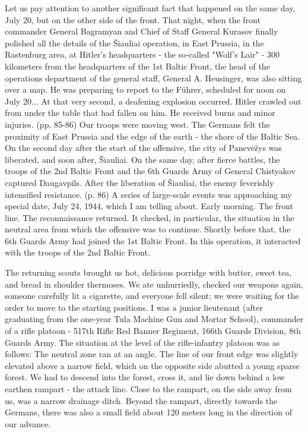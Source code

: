 Let us pay attention to another significant fact that happened on the same day, July 20, but on the other side of the front. That night, when the front commander General Bagramyan and Chief of Staff General Kurasov finally polished all the details of the Šiauliai operation, in East Prussia, in the Rastenburg area, at Hitler's headquarters - the so-called "Wolf's Lair" - 300 kilometers from the headquarters of the 1st Baltic Front, the head of the operations department of the general staff, General A. Heusinger, was also sitting over a map. He was preparing to report to the Führer, scheduled for noon on July 20... At that very second, a deafening explosion occurred. Hitler crawled out from under the table that had fallen on him. He received burns and minor injuries. (pp. 85-86) Our troops were moving west. The Germans felt the proximity of East Prussia and the edge of the earth - the shore of the Baltic Sea. On the second day after the start of the offensive, the city of Panevėžys was liberated, and soon after, Šiauliai. On the same day, after fierce battles, the troops of the 2nd Baltic Front and the 6th Guards Army of General Chistyakov captured Daugavpils. After the liberation of Šiauliai, the enemy feverishly intensified resistance. (p. 86) A series of large-scale events was approaching my special date, July 24, 1944, which I am telling about. Early morning. The front line. The reconnaissance returned. It checked, in particular, the situation in the neutral area from which the offensive was to continue. Shortly before that, the 6th Guards Army had joined the 1st Baltic Front. In this operation, it interacted with the troops of the 2nd Baltic Front.

\label{5-1}

The returning scouts brought us hot, delicious porridge with butter, sweet tea, and bread in shoulder thermoses. We ate unhurriedly, checked our weapons again, someone carefully lit a cigarette, and everyone fell silent; we were waiting for the order to move to the starting positions. I was a junior lieutenant (after graduating from the one-year Tula Machine Gun and Mortar School), commander of a rifle platoon - 517th Rifle Red Banner Regiment, 166th Guards Division, 8th Guards Army. The situation at the level of the rifle-infantry platoon was as follows: The neutral zone ran at an angle. The line of our front edge was slightly elevated above a narrow field, which on the opposite side abutted a young sparse forest. We had to descend into the forest, cross it, and lie down behind a low earthen rampart - the attack line. Close to the rampart, on the side away from us, was a narrow drainage ditch. Beyond the rampart, directly towards the Germans, there was also a small field about 120 meters long in the direction of our advance.

